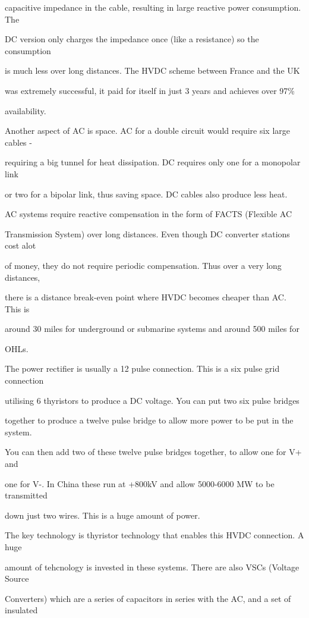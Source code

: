 capacitive impedance in the cable, resulting in large reactive power consumption. The 

DC version only charges the impedance once (like a resistance) so the consumption 

is much less over long distances. The HVDC scheme between France and the UK 

was extremely successful, it paid for itself in just 3 years and achieves over 97\% 

availability. 

Another aspect of AC is space. AC for a double circuit would require six large cables - 

requiring a big tunnel for heat dissipation. DC requires only one for a monopolar link 

or two for a bipolar link, thus saving space. DC cables also produce less heat.

AC systems require reactive compensation in the form of FACTS (Flexible AC 

Transmission System) over long distances. Even though DC converter stations cost alot 

of money, they do not require periodic compensation. Thus over a very long distances, 

there is a distance break-even point where HVDC becomes cheaper than AC. This is 

around 30 miles for underground or submarine systems and around 500 miles for 

OHLs.

The power rectifier is usually a 12 pulse connection. This is a six pulse grid connection 

utilising 6 thyristors to produce a DC voltage. You can put two six pulse bridges 

together to produce a twelve pulse bridge to allow more power to be put in the system. 

You can then add two of these twelve pulse bridges together, to allow one for V+ and 

one for V-. In China these run at +\-800kV and allow 5000-6000 MW to be transmitted 

down just two wires. This is a huge amount of power.

The key technology is thyristor technology that enables this HVDC connection. A huge 

amount of tehcnology is invested in these systems. There are also VSCs (Voltage Source 

Converters) which are a series of capacitors in series with the AC, and a set of insulated 

